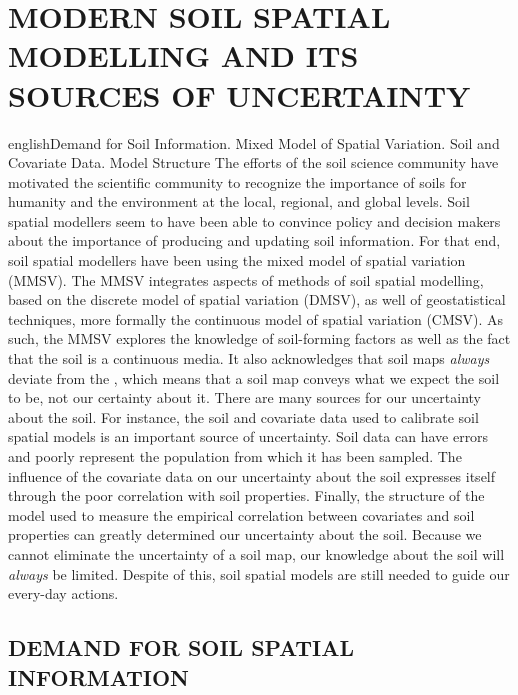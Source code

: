\artigotrue
\chapter{MODERN SOIL SPATIAL MODELLING AND ITS SOURCES OF UNCERTAINTY}
\label{chap:chap02}

\def\enkeys{Demand for Soil Information. Mixed Model of Spatial Variation. Soil and Covariate Data. Model 
Structure}
  
\begin{chapterabstract}{english}{\enkeys}
The efforts of the soil science community have motivated the scientific community to recognize the importance 
of soils for humanity and the environment at the local, regional, and global levels. Soil spatial modellers 
seem to have been able to convince policy and decision makers about the importance of producing and updating 
soil information. For that end, soil spatial modellers have been using the mixed model of spatial variation 
(MMSV). The MMSV integrates aspects of  methods of soil spatial modelling, based on the discrete 
model of spatial variation (DMSV), as well of geostatistical techniques, more formally the continuous model of 
spatial variation (CMSV). As such, the MMSV explores the knowledge of soil-forming factors as well as the fact 
that the soil is a continuous media. It also acknowledges that soil maps \emph{always} deviate from the 
, which means that a soil map conveys what we expect the soil to be, not our certainty about it. 
There are many sources for our uncertainty about the soil. For instance, the soil and covariate data used to 
calibrate soil spatial models is an important source of uncertainty. Soil data can have errors and poorly 
represent the population from which it has been sampled. The influence of the covariate data on our 
uncertainty about the soil expresses itself through the poor correlation with soil properties. Finally, the 
structure of the model used to measure the empirical correlation between covariates and soil properties can 
greatly determined our uncertainty about the soil. Because we cannot eliminate the uncertainty of a soil map, 
our knowledge about the soil will \emph{always} be limited. Despite of this, soil spatial models are still 
needed to guide our every-day actions.
\end{chapterabstract}

\formatchapter

\section{DEMAND FOR SOIL SPATIAL INFORMATION}

